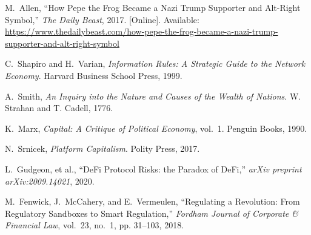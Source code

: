 \documentclass[a4paper,12pt]{article}
\begin{document}
\begin{thebibliography}{99}
M.~Allen,
  ``How Pepe the Frog Became a Nazi Trump Supporter and Alt-Right Symbol,''
  \emph{The Daily Beast}, 2017. [Online]. Available:
  \url{https://www.thedailybeast.com/how-pepe-the-frog-became-a-nazi-trump-supporter-and-alt-right-symbol}

C.~Shapiro and H.~Varian,
  \emph{Information Rules: A Strategic Guide to the Network Economy}.
  Harvard Business School Press, 1999.

A.~Smith,
  \emph{An Inquiry into the Nature and Causes of the Wealth of Nations}.
  W. Strahan and T. Cadell, 1776.

K.~Marx,
  \emph{Capital: A Critique of Political Economy}, vol.~1.
  Penguin Books, 1990.

N.~Srnicek,
  \emph{Platform Capitalism}.
  Polity Press, 2017.

L.~Gudgeon, et al.,
  ``DeFi Protocol Risks: the Paradox of DeFi,''
  \emph{arXiv preprint arXiv:2009.14021}, 2020.

M.~Fenwick, J.~McCahery, and E.~Vermeulen,
  ``Regulating a Revolution: From Regulatory Sandboxes to Smart Regulation,''
  \emph{Fordham Journal of Corporate \& Financial Law}, vol.~23, no.~1, pp. 31--103, 2018.

\end{thebibliography}
\end{document}
